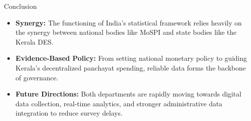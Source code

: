 \documentclass[aspectratio=169]{beamer}
\begin{document}
\begin{frame}{Conclusion}
    \begin{itemize}
        \item \textbf{Synergy:} The functioning of India's statistical framework relies heavily on the synergy between national bodies like MoSPI and state bodies like the Kerala DES.
        \item \textbf{Evidence-Based Policy:} From setting national monetary policy to guiding Kerala's decentralized panchayat spending, reliable data forms the backbone of governance.
        \item \textbf{Future Directions:} Both departments are rapidly moving towards digital data collection, real-time analytics, and stronger administrative data integration to reduce survey delays.
    \end{itemize}
\end{frame}
\end{document}
